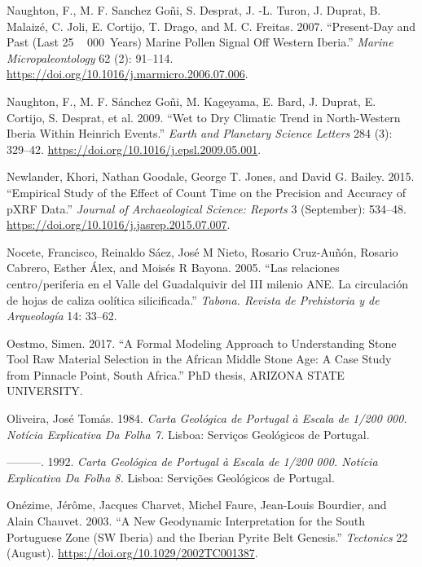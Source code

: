 \documentclass[
  a4paper,
  DIV=11,
  numbers=noendperiod]{scrreprt}
\newlength{\cslhangindent}
\newenvironment{CSLReferences}[2] %
 {\begin{list}{}{%
  \setlength{\itemindent}{0pt}
  \setlength{\leftmargin}{0pt}
  \setlength{\parsep}{0pt}
  \ifodd #1
   \setlength{\leftmargin}{\cslhangindent}
   \setlength{\itemindent}{-1\cslhangindent}
  \fi
  \setlength{\itemsep}{#2\baselineskip}}}
 {\end{list}}
\begin{document}
\begin{CSLReferences}{1}{0}
Naughton, F., M. F. Sanchez Goñi, S. Desprat, J. -L. Turon, J. Duprat,
B. Malaizé, C. Joli, E. Cortijo, T. Drago, and M. C. Freitas. 2007.
{``Present-Day and Past (Last 25 ~ 000~Years) Marine Pollen Signal Off
Western Iberia.''} \emph{Marine Micropaleontology} 62 (2): 91--114.
\url{https://doi.org/10.1016/j.marmicro.2006.07.006}.

Naughton, F., M. F. Sánchez Goñi, M. Kageyama, E. Bard, J. Duprat, E.
Cortijo, S. Desprat, et al. 2009. {``Wet to Dry Climatic Trend in
North-Western {Iberia} Within {Heinrich} Events.''} \emph{Earth and
Planetary Science Letters} 284 (3): 329--42.
\url{https://doi.org/10.1016/j.epsl.2009.05.001}.

Newlander, Khori, Nathan Goodale, George T. Jones, and David G. Bailey.
2015. {``Empirical Study of the Effect of Count Time on the Precision
and Accuracy of {pXRF} Data.''} \emph{Journal of Archaeological Science:
Reports} 3 (September): 534--48.
\url{https://doi.org/10.1016/j.jasrep.2015.07.007}.

Nocete, Francisco, Reinaldo Sáez, José M Nieto, Rosario Cruz-Auñón,
Rosario Cabrero, Esther Álex, and Moisés R Bayona. 2005. {``{Las
relaciones centro/periferia en el Valle del Guadalquivir del III milenio
ANE. La circulaci{ó}n de hojas de caliza ool{í}tica silicificada}.''}
\emph{Tabona. Revista de Prehistoria y de Arqueolog{í}a} 14: 33--62.

Oestmo, Simen. 2017. {``A {Formal Modeling Approach} to {Understanding
Stone Tool Raw Material Selection} in the {African Middle Stone Age}: {A
Case Study} from {Pinnacle Point}, {South Africa}.''} PhD thesis,
ARIZONA STATE UNIVERSITY.

Oliveira, José Tomás. 1984. \emph{Carta {Geol{ó}gica} de {Portugal} {à}
Escala de 1/200 000. {Not{í}cia Explicativa} Da {Folha} 7.} Lisboa:
Servi{ç}os Geol{ó}gicos de Portugal.

---------. 1992. \emph{Carta {Geol{ó}gica} de {Portugal} {à} Escala de
1/200 000. {Not{í}cia Explicativa} Da {Folha} 8.} Lisboa: Servi{ç}{õ}es
Geol{ó}gicos de Portugal.

Onézime, Jérôme, Jacques Charvet, Michel Faure, Jean-Louis Bourdier, and
Alain Chauvet. 2003. {``A New Geodynamic Interpretation for the {South
Portuguese Zone} ({SW Iberia}) and the {Iberian Pyrite Belt} Genesis.''}
\emph{Tectonics} 22 (August).
\url{https://doi.org/10.1029/2002TC001387}.


\end{CSLReferences}
\end{document}
